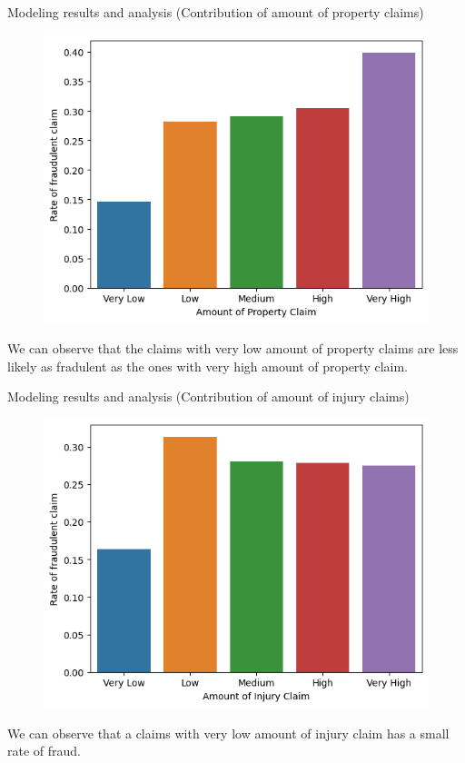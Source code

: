 \documentclass[aspectratio=169,xcolor=dvipsnames]{beamer}
\begin{document}
\begin{frame}{Modeling results and analysis (Contribution of amount of property claims)}

\begin{figure}
\includegraphics[scale = 0.5]{AOPC.png}
\end{figure}

We can observe that the claims with very low amount of property claims are less likely as fradulent as the ones with very high amount of property claim. 

\end{frame}

\begin{frame}{Modeling results and analysis (Contribution of amount of injury claims)}

\begin{figure}
\includegraphics[scale = 0.5]{AOIC.png}
\end{figure}

We can observe that a claims with very low amount of injury claim has a small rate of fraud.

\end{frame}
\end{document}

